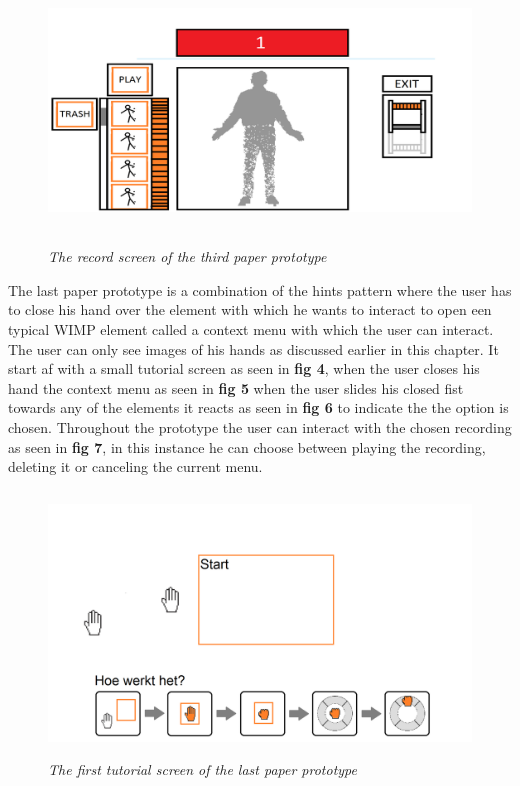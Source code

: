 \begin{figure}[H]
	\begin{center}
		\includegraphics[width=12.5cm, height=7cm]{figures/prototype_6_3_record.png}
		\caption{\emph{The record screen of the third paper prototype}}
		\label{record third prototype}
	\end{center}
\end{figure}

The last paper prototype is a combination of the hints pattern where the user has to close his hand over the element with which he wants to interact to open een typical WIMP element called a context menu with which the user can interact. The user can only see images of his hands as discussed earlier in this chapter. It start af with a small tutorial screen as seen in \textbf{ fig 4}, when the user closes his hand the context menu as seen in \textbf{ fig 5} when the user slides his closed fist towards any of the elements it reacts as seen in \textbf{ fig 6} to indicate the the option is chosen. Throughout the prototype the user can interact with the chosen recording as seen in \textbf{ fig 7}, in this instance he can choose between playing the recording, deleting it or canceling the current menu.\\

\begin{figure}[H]
	\begin{center}
		\includegraphics[width=12.5cm, height=7cm]{figures/prototype_7_6_tutorial_1.png}
		\caption{\emph{The first tutorial screen of the last paper prototype}}
		\label{The first tutorial screen of the last paper prototype}
	\end{center}
\end{figure}

